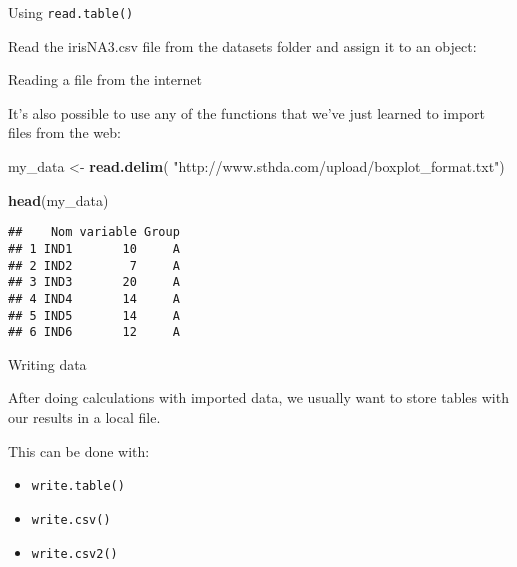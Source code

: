 \documentclass[ignorenonframetext,]{beamer}
\newenvironment{Shaded}{\begin{snugshade}}{\end{snugshade}}
\newcommand{\DataTypeTok}[1]{\textcolor[rgb]{0.13,0.29,0.53}{#1}}
\newcommand{\DecValTok}[1]{\textcolor[rgb]{0.00,0.00,0.81}{#1}}
\newcommand{\KeywordTok}[1]{\textcolor[rgb]{0.13,0.29,0.53}{\textbf{#1}}}
\newcommand{\NormalTok}[1]{#1}
\newcommand{\OtherTok}[1]{\textcolor[rgb]{0.56,0.35,0.01}{#1}}
\newcommand{\StringTok}[1]{\textcolor[rgb]{0.31,0.60,0.02}{#1}}
\providecommand{\tightlist}{%
  \setlength{\itemsep}{0pt}\setlength{\parskip}{0pt}}
\begin{document}
\begin{frame}[fragile]{Using \texttt{read.table()}}
\protect\hypertarget{using-read.table-6}{}

Read the irisNA3.csv file from the datasets folder and assign it to an
object:

\begin{Shaded}
\end{Shaded}

\end{frame}

\begin{frame}[fragile]{Reading a file from the internet}
\protect\hypertarget{reading-a-file-from-the-internet}{}

It's also possible to use any of the functions that we've just learned
to import files from the web:

\begin{Shaded}
\begin{Highlighting}[]
\NormalTok{my_data <-}\StringTok{ }\KeywordTok{read.delim}\NormalTok{(}
  \StringTok{"http://www.sthda.com/upload/boxplot_format.txt"}\NormalTok{)}

\KeywordTok{head}\NormalTok{(my_data)}
\end{Highlighting}
\end{Shaded}

\begin{verbatim}
##    Nom variable Group
## 1 IND1       10     A
## 2 IND2        7     A
## 3 IND3       20     A
## 4 IND4       14     A
## 5 IND5       14     A
## 6 IND6       12     A
\end{verbatim}

\end{frame}

\begin{frame}[fragile]{Writing data}
\protect\hypertarget{writing-data}{}

After doing calculations with imported data, we usually want to store
tables with our results in a local file.

This can be done with:

\begin{itemize}
\tightlist
\item
  \texttt{write.table()}
\item
  \texttt{write.csv()}
\item
  \texttt{write.csv2()}
\end{itemize}

\end{frame}
\end{document}
